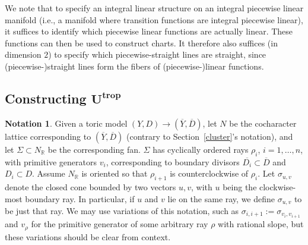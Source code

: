 \documentclass[11pt]{article}
\numberwithin{equation}{section}
\numberwithin{figure}{section}
\numberwithin{table}{section}
\DeclareMathOperator{\trop}{trop}
\let\?=\overline
\let\bb=\mathbb
\let\rar=\rightarrow
\theoremstyle{definition}
\newtheorem{ntn}[thm]{Notation}
\begin{document}
We note that to specify an integral linear structure on an integral piecewise linear manifold (i.e., a manifold where transition functions are integral piecewise linear), it suffices to identify which piecewise linear functions are actually linear. These functions can then be used to construct charts. It therefore also suffices (in dimension $2$) to specify which piecewise-straight lines are straight, since (piecewise-)straight lines form the fibers of (piecewise-)linear functions.

\subsection[Constructing $U^{\trop}$]{Constructing $\boldsymbol{U^{\trop}}$} \label{Ut}

\begin{ntn}\label{UtropNotation} Given a toric model $(Y,D) \rar (\?{Y},\?{D})$, let $N$ be the cocharacter lattice corresponding to $(\?{Y},\?{D})$ (contrary to Section~\ref{cluster}'s notation), and let $\Sigma\subset N_{\bb{R}}$ be the corresponding fan. $\Sigma$ has cyclically ordered rays $\rho_i$, $i=1,\dots,n$, with primitive generators $v_i$, corresponding to boundary divisors $\?{D_i}\subset \?{D}$ and $D_i \subset D$. Assume $N_{\bb{R}}$ is oriented so that $\rho_{i+1}$ is counterclockwise of $\rho_i$. Let $\sigma_{u,v}$ denote the closed cone bounded by two vectors $u,v$, with $u$ being the clockwise-most boundary ray. In particular, if $u$ and $v$ lie on the same ray, we define $\sigma_{u,v}$ to be just that ray. We may use variations of this notation, such as $\sigma_{i,i+1}:=\sigma_{v_i,v_{i+1}}$ and $v_{\rho}$ for the primitive generator of some arbitrary ray $\rho$ with rational slope, but these variations should be clear from context.
\end{ntn}
\end{document}
